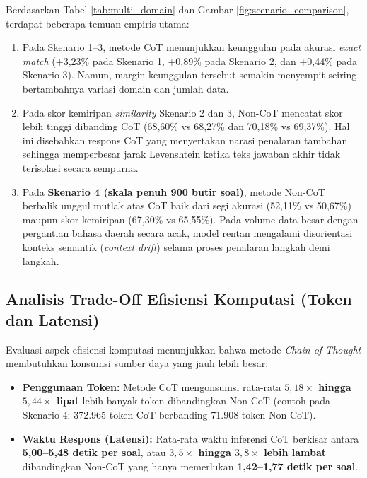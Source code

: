 \documentclass[10pt,a4paper]{article}
\begin{document}
Berdasarkan Tabel \ref{tab:multi_domain} dan Gambar \ref{fig:scenario_comparison}, terdapat beberapa temuan empiris utama:
\begin{enumerate}\setlength{\itemsep}{0pt}\setlength{\parskip}{0pt}
    \item Pada Skenario 1--3, metode CoT menunjukkan keunggulan pada akurasi \textit{exact match} (+3,23\% pada Skenario 1, +0,89\% pada Skenario 2, dan +0,44\% pada Skenario 3). Namun, margin keunggulan tersebut semakin menyempit seiring bertambahnya variasi domain dan jumlah data.
    \item Pada skor kemiripan \textit{similarity} Skenario 2 dan 3, Non-CoT mencatat skor lebih tinggi dibanding CoT (68,60\% vs 68,27\% dan 70,18\% vs 69,37\%). Hal ini disebabkan respons CoT yang menyertakan narasi penalaran tambahan sehingga memperbesar jarak Levenshtein ketika teks jawaban akhir tidak terisolasi secara sempurna.
    \item Pada \textbf{Skenario 4 (skala penuh 900 butir soal)}, metode Non-CoT berbalik unggul mutlak atas CoT baik dari segi akurasi (52,11\% vs 50,67\%) maupun skor kemiripan (67,30\% vs 65,55\%). Pada volume data besar dengan pergantian bahasa daerah secara acak, model rentan mengalami disorientasi konteks semantik (\textit{context drift}) selama proses penalaran langkah demi langkah.
\end{enumerate}

\subsection{Analisis Trade-Off Efisiensi Komputasi (Token dan Latensi)}
Evaluasi aspek efisiensi komputasi menunjukkan bahwa metode \textit{Chain-of-Thought} membutuhkan konsumsi sumber daya yang jauh lebih besar:
\begin{itemize}\setlength{\itemsep}{0pt}\setlength{\parskip}{0pt}
    \item \textbf{Penggunaan Token:} Metode CoT mengonsumsi rata-rata \textbf{$5{,}18\times$ hingga $5{,}44\times$ lipat} lebih banyak token dibandingkan Non-CoT (contoh pada Skenario 4: 372.965 token CoT berbanding 71.908 token Non-CoT).
    \item \textbf{Waktu Respons (Latensi):} Rata-rata waktu inferensi CoT berkisar antara \textbf{5,00--5,48 detik per soal}, atau \textbf{$3{,}5\times$ hingga $3{,}8\times$ lebih lambat} dibandingkan Non-CoT yang hanya memerlukan \textbf{1,42--1,77 detik per soal}.
\end{itemize}
\end{document}
